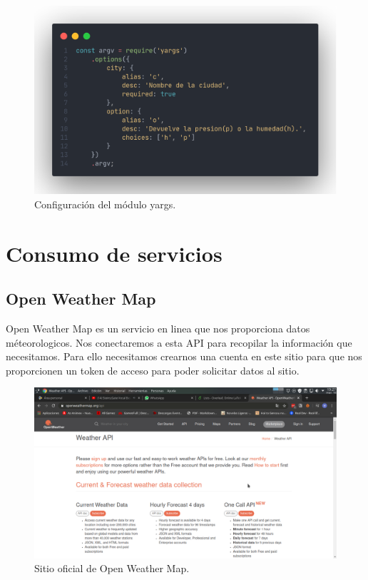 \documentclass[12pt]{article}
\begin{document}
\begin{figure}[H]
    \centering
    \includegraphics[scale=.25]{assets/images/yargs.png}
    \caption{Configuración del módulo yargs.}
\end{figure}

\section{Consumo de servicios}

\subsection{Open Weather Map}

Open Weather Map es un servicio en linea que nos proporciona datos méteorologicos. Nos conectaremos a esta API para recopilar la información que necesitamos. Para ello necesitamos crearnos una cuenta en este sitio para que nos proporcionen un token de acceso para poder solicitar datos al sitio.

\begin{figure}[H]
    \centering
    \includegraphics[scale=.35]{assets/images/api.png}
    \caption{Sitio oficial de Open Weather Map.}
\end{figure}
\end{document}
